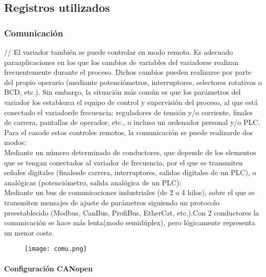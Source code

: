 
\subsection{Registros utilizados}

\subsubsection{Comunicación}
//
El   variador   también   se   puede   controlar   en   modo   remoto.   Es   adecuado   paraaplicaciones en   los   que   los   cambios   de   variables   del   variadorse   realizan frecuentemente  durante  el proceso.  Dichos  cambios  pueden  realizarse  por  parte  del propio  operario  (mediante  potenciómetros,  interruptores,  selectores  rotativos  o  BCD, etc.).  Sin  embargo,  la  situación  más  común  es  que  los  parámetros  del  variador  los establezca  el  equipo  de  control  y  supervisión  del  proceso,  al  que  está  conectado  el variadorde  frecuencia: reguladores  de  tensión  y/o  corriente,  finales  de  carrera, pantallas de operador, etc., o incluso un ordenador personal y/o PLC. Para  el  casode  estos  controles  remotos,  la  comunicación  se  puede  realizarde  dos modos:\\Mediante un  número  determinado  de  conductores,  que  depende  de  los elementos que se tengan conectados al variador de frecuencia, por el que se transmiten señales digitales (finalesde carrera, interruptores, salidas digitales de un PLC), o analógicas (potenciómetro, salida analógica de un PLC):\\Mediante un bus de comunicaciones industriales (de 2 o 4 hilos), sobre el que se transmiten   mensajes   de   ajuste   de   parámetros   siguiendo   un   protocolo preestablecido (Modbus, CanBus, ProfiBus, EtherCat, etc.).Con 2  conductores la  comunicación  se  hace  más  lenta(modo  semidúplex),  pero  lógicamente representa un menor coste.

\begin{figure}[htb]
	\centering
	\texttt{[image: comu.png]}
\end{figure}


\paragraph{Configuración CANopen}

\\
\\


